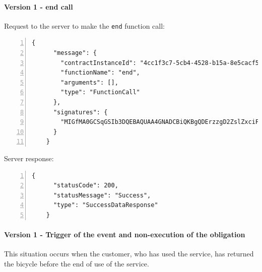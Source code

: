 \paragraph{Version 1 - end call}

Request to the server to make the \verb|end| function call:
{
  \small
  \begin{Verbatim}[numbers=left,xleftmargin=1cm,firstnumber=1,breaklines=true,breakanywhere=true,tabsize=2]
    {
      "message": {
        "contractInstanceId": "4cc1f3c7-5cb4-4528-b15a-8e5cacf5b18a",
        "functionName": "end",
        "arguments": [],
        "type": "FunctionCall"
      },
      "signatures": {
        "MIGfMA0GCSqGSIb3DQEBAQUAA4GNADCBiQKBgQDErzzgD2ZslZxciFAiX3/ot7lrkZDw4148jFZrsDZPE6CVs9xXFSHGgy/mFvIFLXhnChO6Nyd2be3lbgeavLMCMVUiTStXr117Km17keWpb3sItkKKsLFBOcIIU8XXowI/OhzQN2XPZYESHgjdQ5vwEj2YyueiS7WKP94YWz/pswIDAQAB": "hU6i0eGRNcZB+ZCxeLCPBM31iai412yczQ4/Td+roq9jnBU7agWfuOyVl/6fCKdTZcKkxASJs1tCpe4bLlpUHt01lFlGM8n9+sPHXl+1/jXMngmmPhuNUPrtsD7PGeFtuC3JJkcqTq3WkyWz6nVdn55bzX6BxleN/I6MPgmDroc="
      }
    }
  \end{Verbatim}
}

Server response:
{
  \small
  \begin{Verbatim}[numbers=left,xleftmargin=1cm,firstnumber=1,breaklines=true,breakanywhere=true,tabsize=2]
    {
      "statusCode": 200,
      "statusMessage": "Success",
      "type": "SuccessDataResponse"
    }
  \end{Verbatim}
}

\paragraph{Version 1 - Trigger of the event and non-execution of the obligation}

This situation occurs when the customer, who has used the service, has returned the bicycle before the 
end of use of the service.

